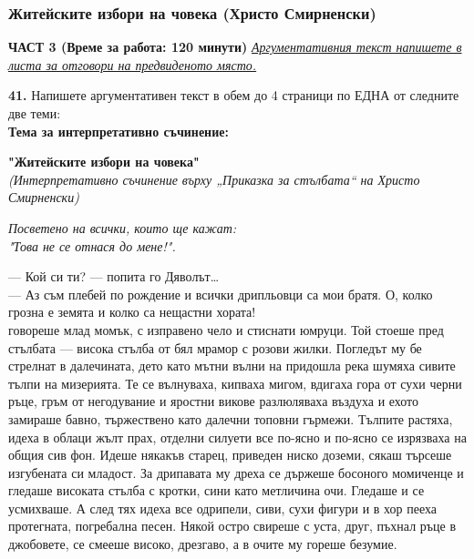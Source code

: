 \documentclass[12pt,a4paper]{article}
\begin{document}
\subsubsection{Житейските избори на човека (Христо Смирненски)}
\vspace{0.5cm}
\begin{center}
\textbf{ЧАСТ 3 (Време за работа: 120 минути)}
\vspace{0.2cm}
{\textit{\underline{Аргументативния текст напишете в листа за отговори на предвиденото място.}}}
\vspace{0.1cm}
\end{center}
\textbf{41.} Напишете аргументативен текст в обем до 4 страници по ЕДНА от следните две теми:
\\
\vspace{0.2cm}
\textbf{Тема за интерпретативно съчинение:}
\vspace{0.1cm}
\begin{center}
\textbf{"Житейските избори на човека"}
\\
\textit{(Интерпретативно съчинение върху „Приказка за стълбата“ на Христо Смирненски)}
\end{center}
\begin{flushright}
    \textit{Посветено на всички, които ще кажат: 
    \\ "Това не се отнася до мене!".}
\end{flushright}
— Кой си ти? — попита го Дяволът…
\\
— Аз съм плебей по рождение и всички дрипльовци са мои братя. О, колко грозна е земята и колко са нещастни хората!
\\
 говореше млад момък, с изправено чело и стиснати юмруци. Той стоеше пред стълбата — висока стълба от бял мрамор с розови жилки. Погледът му бе стрелнат в далечината, дето като мътни вълни на придошла река шумяха сивите тълпи на мизерията. Те се вълнуваха, кипваха мигом, вдигаха гора от сухи черни ръце, гръм от негодувание и яростни викове разлюляваха въздуха и ехото замираше бавно, тържествено като далечни топовни гърмежи. Тълпите растяха, идеха в облаци жълт прах, отделни силуети все по-ясно и по-ясно се изрязваха на общия сив фон. Идеше някакъв старец, приведен ниско доземи, сякаш търсеше изгубената си младост. За дрипавата му дреха се държеше босоного момиченце и гледаше високата стълба с кротки, сини като метличина очи. Гледаше и се усмихваше. А след тях идеха все одрипели, сиви, сухи фигури и в хор пееха протегната, погребална песен. Някой остро свиреше с уста, друг, пъхнал ръце в джобовете, се смееше високо, дрезгаво, а в очите му гореше безумие.
\end{document}

